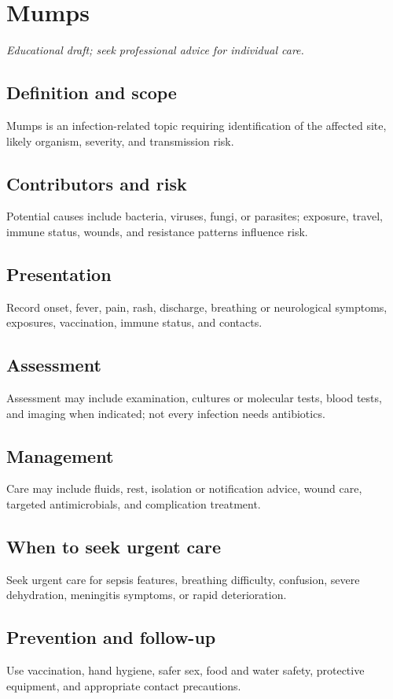 \chapter{Mumps}

\medskip
\noindent\textit{Educational draft; seek professional advice for individual care.}

\section*{Definition and scope}
Mumps is an infection-related topic requiring identification of the affected site, likely organism, severity, and transmission risk.

\section*{Contributors and risk}
Potential causes include bacteria, viruses, fungi, or parasites; exposure, travel, immune status, wounds, and resistance patterns influence risk.

\section*{Presentation}
Record onset, fever, pain, rash, discharge, breathing or neurological symptoms, exposures, vaccination, immune status, and contacts.

\section*{Assessment}
Assessment may include examination, cultures or molecular tests, blood tests, and imaging when indicated; not every infection needs antibiotics.

\section*{Management}
Care may include fluids, rest, isolation or notification advice, wound care, targeted antimicrobials, and complication treatment.

\section*{When to seek urgent care}
Seek urgent care for sepsis features, breathing difficulty, confusion, severe dehydration, meningitis symptoms, or rapid deterioration.

\section*{Prevention and follow-up}
Use vaccination, hand hygiene, safer sex, food and water safety, protective equipment, and appropriate contact precautions.

